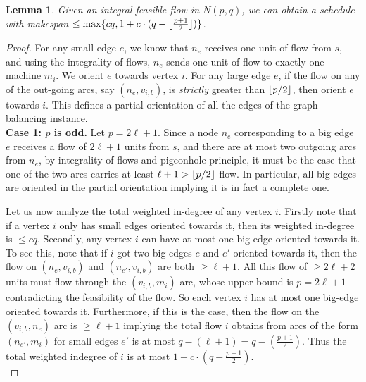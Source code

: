 \documentclass[11pt]{article}
\DeclarePairedDelimiter\floor{\lfloor}{\rfloor}
\newtheorem{lemma}{Lemma}
\begin{document}
\begin{lemma}\label{lem:3}
	Given an integral feasible flow in $N(p,q)$, we can obtain a schedule with makespan $\leq \max \{c q, 1 + c\cdot (q - \floor{\frac{p+1}{2}})\}$.
\end{lemma}
\begin{proof}
For any small edge $e$, we know that $n_e$ receives one unit of flow from $s$, and using the integrality of flows, $n_e$ sends one unit of flow to exactly one machine $m_i$. We orient $e$ towards vertex $i$.
    For any large edge $e$, if the flow on any of the out-going arcs, say $(n_e,v_{i,b})$,  is {\em strictly} greater than $\floor{p/2}$, then orient $e$ towards $i$.  This defines a partial orientation of all the edges of the graph balancing instance. \\
    
   \noindent
    {\bf Case 1: $p$ is odd.} Let $p=2\ell + 1$. Since a node $n_e$ corresponding to a big edge $e$ receives a flow of $2\ell + 1 $ units from $s$, and there are at most two outgoing arcs from $n_e$, 
    by integrality of flows and pigeonhole principle, it must be the case that one of the two arcs  carries at least $\ell+1 > \floor{p/2}$ flow. In particular, all big edges are oriented in the partial orientation implying it is in fact a complete one.
   
   Let us now analyze the total weighted in-degree of any vertex $i$.  Firstly note that if a vertex $i$ only has small edges oriented towards it, then its weighted in-degree is $\leq c q$. 
Secondly, any vertex $i$ can have at most one big-edge oriented towards it. To see this, note that if $i$ got two big edges $e$ and $e'$ oriented towards it, then the flow on $(n_e,v_{i,b})$ and $(n_{e'},v_{i,b})$ are both $\geq \ell + 1$. All this flow of $\geq 2\ell + 2$ units must flow through the $(v_{i,b},m_i)$ arc, whose upper bound is $p = 2\ell+1$ contradicting the feasibility of the flow. So each vertex $i$ has at most one big-edge oriented towards it.  Furthermore, if this is the case, then the flow on the $(v_{i,b},n_e)$ arc is $\geq \ell + 1$ implying the total flow $i$ obtains from arcs of the form $(n_{e'},m_i)$ for small edges $e'$ is at most $q - (\ell + 1)=q - (\frac{p+1}{2})$. Thus the total weighted indegree of $i$ is at most $1 + c\cdot (q - \frac{p+1}{2})$.\\ 
   	

\end{proof}
\end{document}
